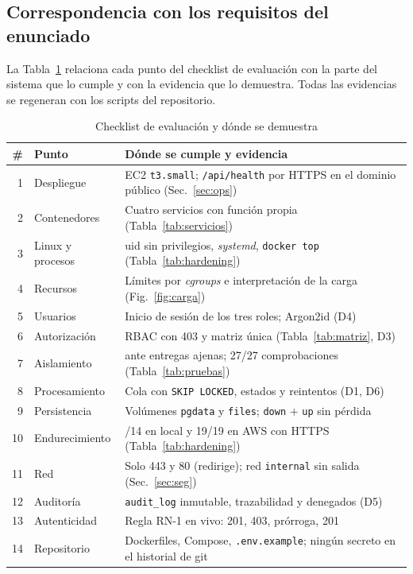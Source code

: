 \documentclass[conference,a4paper]{IEEEtran}
\newcommand{\cod}[1]{\texttt{#1}}
\begin{document}
\subsection{Correspondencia con los requisitos del enunciado}
La Tabla~\ref{tab:checklist} relaciona cada punto del checklist de evaluación con la parte del sistema que lo cumple y con la evidencia que lo demuestra. Todas las evidencias se regeneran con los scripts del repositorio.

\begin{table}[!t]
\caption{Checklist de evaluación y dónde se demuestra}\label{tab:checklist}
\centering\footnotesize
\setlength{\tabcolsep}{3pt}
\begin{tabular}{@{}r >{\raggedright\arraybackslash}p{1.95cm} >{\raggedright\arraybackslash}p{5.35cm}@{}}
\toprule
\# & Punto & Dónde se cumple y evidencia\\
\midrule
1 & Despliegue & EC2 \cod{t3.small}; \cod{/api/health} por HTTPS en el dominio público (Sec.~\ref{sec:ops})\\
2 & Contenedores & Cuatro servicios con función propia (Tabla~\ref{tab:servicios})\\
3 & Linux y procesos & uid sin privilegios, \textit{systemd}, \cod{docker top} (Tabla~\ref{tab:hardening})\\
4 & Recursos & Límites por \textit{cgroups} e interpretación de la carga (Fig.~\ref{fig:carga})\\
5 & Usuarios & Inicio de sesión de los tres roles; Argon2id (D4)\\
6 & Autorización & RBAC con 403 y matriz única (Tabla~\ref{tab:matriz}, D3)\\
7 & Aislamiento & 404 ante entregas ajenas; 27/27 comprobaciones (Tabla~\ref{tab:pruebas})\\
8 & Procesamiento & Cola con \cod{SKIP LOCKED}, estados y reintentos (D1, D6)\\
9 & Persistencia & Volúmenes \cod{pgdata} y \cod{files}; \cod{down} + \cod{up} sin pérdida\\
10 & Endurecimiento & 14/14 en local y 19/19 en AWS con HTTPS (Tabla~\ref{tab:hardening})\\
11 & Red & Solo 443 y 80 (redirige); red \cod{internal} sin salida (Sec.~\ref{sec:seg})\\
12 & Auditoría & \cod{audit\_log} inmutable, trazabilidad y denegados (D5)\\
13 & Autenticidad & Regla RN-1 en vivo: 201, 403, prórroga, 201\\
14 & Repositorio & Dockerfiles, Compose, \cod{.env.example}; ningún secreto en el historial de git\\
\bottomrule
\end{tabular}
\end{table}
\end{document}
